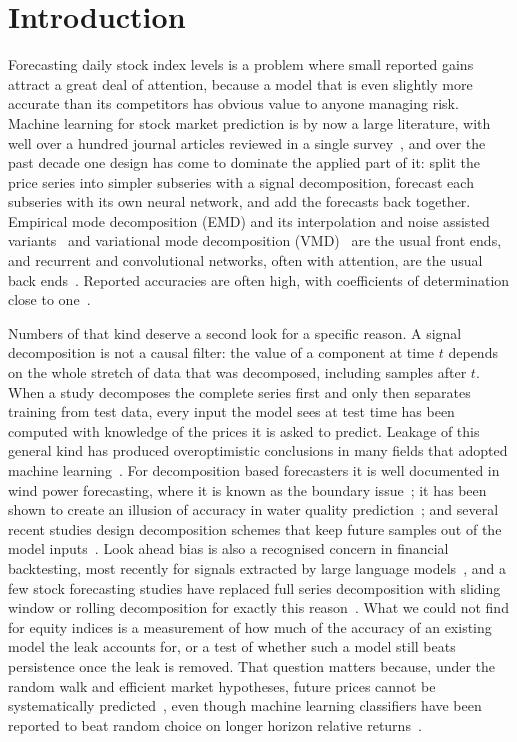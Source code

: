 \section{Introduction}\label{sec:intro}

Forecasting daily stock index levels is a problem where small reported gains
attract a great deal of attention, because a model that is even slightly more
accurate than its competitors has obvious value to anyone managing risk.
Machine learning for stock market prediction is by now a large literature, with
well over a hundred journal articles reviewed in a single survey~\cite{kumbure2022},
and over the past decade one design has come to dominate the applied part of
it: split the price series into simpler subseries with a signal decomposition,
forecast each subseries with its own neural network, and add the forecasts back
together. Empirical mode decomposition (EMD) and its interpolation and noise
assisted variants~\cite{akimaemd2023,gruceemdan2023,ceemdanstock2025} and
variational mode decomposition (VMD)~\cite{jiang2025,wangwang2026} are the usual
front ends, and recurrent and convolutional networks, often with attention, are
the usual back ends~\cite{gong2024,zhao2025,ning2025}. Reported accuracies are
often high, with coefficients of determination close to
one~\cite{ning2025,jiang2025}.

Numbers of that kind deserve a second look for a specific reason. A signal
decomposition is not a causal filter: the value of a component at time $t$
depends on the whole stretch of data that was decomposed, including samples
after $t$. When a study decomposes the complete series first and only then
separates training from test data, every input the model sees at test time has
been computed with knowledge of the prices it is asked to predict. Leakage of
this general kind has produced overoptimistic conclusions in many fields that
adopted machine learning~\cite{kapoor2023}. For decomposition based
forecasters it is well documented in wind power forecasting, where it is known
as the boundary issue~\cite{chen2022}; it has been shown to create an illusion
of accuracy in water quality prediction~\cite{emdleak2024}; and several recent
studies design decomposition schemes that keep future samples out of the model
inputs~\cite{wang2024,yao2025,pang2026}. Look ahead bias is also a recognised
concern in financial backtesting, most recently for signals extracted by large
language models~\cite{glasserman2024}, and a few stock forecasting studies have
replaced full series decomposition with sliding window or rolling decomposition
for exactly this reason~\cite{liu2022,liu2024,wen2024,zhang2025}. What we could not
find for equity indices is a measurement of how much of the accuracy of an
existing model the leak accounts for, or a test of whether such a model still
beats persistence once the leak is removed. That question matters because,
under the random walk and efficient market hypotheses, future prices cannot be
systematically predicted~\cite{pernagallo2025}, even though machine learning
classifiers have been reported to beat random choice on longer horizon relative
returns~\cite{finrel2024}.

